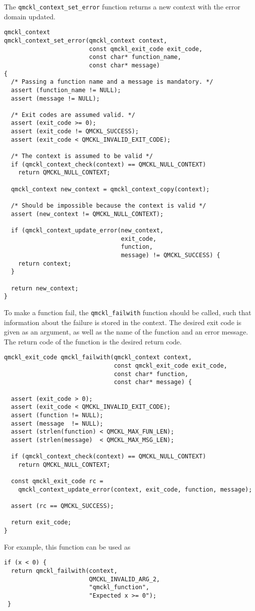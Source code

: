 The \texttt{qmckl\_context\_set\_error} function returns a new context with
the error domain updated.

\begin{verbatim}
qmckl_context
qmckl_context_set_error(qmckl_context context,
                        const qmckl_exit_code exit_code,
                        const char* function_name,
                        const char* message)
{
  /* Passing a function name and a message is mandatory. */
  assert (function_name != NULL);
  assert (message != NULL);

  /* Exit codes are assumed valid. */
  assert (exit_code >= 0);
  assert (exit_code != QMCKL_SUCCESS);
  assert (exit_code < QMCKL_INVALID_EXIT_CODE);

  /* The context is assumed to be valid */
  if (qmckl_context_check(context) == QMCKL_NULL_CONTEXT)
    return QMCKL_NULL_CONTEXT;

  qmckl_context new_context = qmckl_context_copy(context);

  /* Should be impossible because the context is valid */
  assert (new_context != QMCKL_NULL_CONTEXT);

  if (qmckl_context_update_error(new_context,
                                 exit_code,
                                 function,
                                 message) != QMCKL_SUCCESS) {
    return context;
  }

  return new_context;
}
\end{verbatim}


To make a function fail, the \texttt{qmckl\_failwith} function should be
called, such that information about the failure is stored in
the context. The desired exit code is given as an argument, as
well as the name of the function and an error message. The return
code of the function is the desired return code.

\begin{verbatim}
qmckl_exit_code qmckl_failwith(qmckl_context context,
                               const qmckl_exit_code exit_code,
                               const char* function,
                               const char* message) {

  assert (exit_code > 0);
  assert (exit_code < QMCKL_INVALID_EXIT_CODE);
  assert (function != NULL);
  assert (message  != NULL);
  assert (strlen(function) < QMCKL_MAX_FUN_LEN);
  assert (strlen(message)  < QMCKL_MAX_MSG_LEN);

  if (qmckl_context_check(context) == QMCKL_NULL_CONTEXT)
    return QMCKL_NULL_CONTEXT;
  
  const qmckl_exit_code rc = 
    qmckl_context_update_error(context, exit_code, function, message);

  assert (rc == QMCKL_SUCCESS);

  return exit_code;
}

\end{verbatim}

For example, this function can be used as
\begin{verbatim}
if (x < 0) {
  return qmckl_failwith(context,
                        QMCKL_INVALID_ARG_2,
                        "qmckl_function", 
                        "Expected x >= 0");
 }
\end{verbatim}

